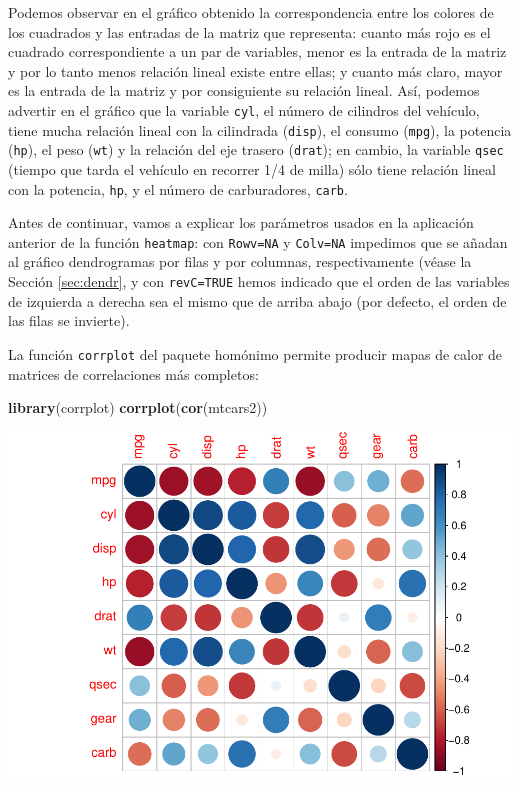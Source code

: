 \documentclass[
]{book}
\newenvironment{Shaded}{\begin{snugshade}}{\end{snugshade}}
\newcommand{\KeywordTok}[1]{\textcolor[rgb]{0.13,0.29,0.53}{\textbf{#1}}}
\newcommand{\NormalTok}[1]{#1}
\theoremstyle{definition}
\theoremstyle{definition}
\theoremstyle{definition}
\theoremstyle{remark}
\begin{document}
Podemos observar en el gráfico obtenido la correspondencia entre los colores de los cuadrados y las entradas de la matriz que representa: cuanto más rojo es el cuadrado correspondiente a un par de variables, menor es la entrada de la matriz y por lo tanto menos relación lineal existe entre ellas; y cuanto más claro,
mayor es la entrada de la matriz y por consiguiente su relación lineal. Así, podemos advertir en el gráfico que la variable \texttt{cyl}, el número de cilindros del vehículo, tiene mucha relación lineal con la cilindrada (\texttt{disp}), el consumo (\texttt{mpg}), la potencia (\texttt{hp}), el peso (\texttt{wt}) y la relación del eje trasero (\texttt{drat}); en cambio, la variable \texttt{qsec} (tiempo que tarda el vehículo en recorrer 1/4 de milla) sólo tiene relación lineal con la potencia, \texttt{hp},
y el número de carburadores, \texttt{carb}.

Antes de continuar, vamos a explicar los parámetros usados en la aplicación anterior de la función \texttt{heatmap}: con \texttt{Rowv=NA} y \texttt{Colv=NA} impedimos que se añadan al gráfico dendrogramas por filas y por columnas, respectivamente (véase la Sección \ref{sec:dendr}, y con \texttt{revC=TRUE} hemos indicado que el orden de las variables de izquierda a derecha sea el mismo que de arriba abajo (por defecto, el orden de las filas se invierte).

La función \texttt{corrplot} del paquete homónimo permite producir mapas de calor de matrices de correlaciones más completos:

\begin{Shaded}
\begin{Highlighting}[]
\KeywordTok{library}\NormalTok{(corrplot)}
\KeywordTok{corrplot}\NormalTok{(}\KeywordTok{cor}\NormalTok{(mtcars2))}
\end{Highlighting}
\end{Shaded}

\begin{center}\includegraphics[width=0.9\linewidth]{14cap13_EDextra_files/figure-latex/unnamed-chunk-13-1} \end{center}
\end{document}
